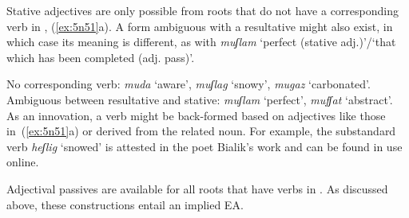 \begin{exe}
\begin{xlist}
\begin{exe}
\begin{xlist}
\begin{exe}
\begin{exe}
\begin{xlist}
\begin{exe}
\begin{exe}
\begin{xlist}
\begin{exe}
\begin{xlist}
\begin{exe}
\begin{xlist}
\begin{exe}
\begin{xlist}
\begin{exe}
\begin{xlist}
\begin{xlist}
\begin{exe}
\begin{xlist}
\begin{exe}
\begin{xlist}
\begin{exe}
\begin{exe}
\begin{exe}
\begin{xlist}
\begin{exe}
\begin{exe}
\begin{xlist}
\begin{exe}
\begin{xlist}
\begin{exe}
\begin{xlist}
\begin{exe}
\begin{xlist}
\begin{xlist}
\begin{exe}
\begin{xlist}
\begin{exe}
\begin{xlist}
\begin{exe}
\begin{xlist}
\begin{exe}
\begin{xlist}
\begin{exe}
\begin{exe}
\begin{exe}
\begin{exe}
\begin{exe}
\begin{xlist}
\begin{xlist}
\begin{exe}
\begin{xlist}
\begin{exe}
\begin{xlist}
\begin{exe}
\begin{exe}
\begin{exe}
\begin{xlist}
\begin{exe}
\begin{xlist}
Stative adjectives are only possible from roots that do not have a corresponding verb in \thif, (\ref{ex:5n51}a). A form ambiguous with a resultative might also exist, in which case its meaning is different, as with \emph{muʃlam} `perfect (stative adj.)'/`that which has been completed (adj. pass)'.
 \begin{exe}
 \ex  \label{ex:5n51}
 \begin{xlist} 
   \ex  No corresponding verb: \emph{muda} `aware', \emph{muʃlag} `snowy', \emph{mugaz} `carbonated'. 
   \ex  Ambiguous between resultative and stative: \emph{muʃlam} `perfect', \emph{mufʃat} `abstract'. 
 \z
\z 
As an innovation, a verb might be back-formed based on adjectives like those in~(\ref{ex:5n51}a) or derived from the related noun. For example, the substandard verb \emph{heʃlig} `snowed' is attested in the poet Bialik's work and can be found in use online.

Adjectival passives are available for all roots that have verbs in \thif. As discussed above, these constructions entail an implied EA.


\end{xlist}
\end{exe}
\end{xlist}
\end{exe}
\end{xlist}
\end{exe}
\end{exe}
\end{exe}
\end{xlist}
\end{exe}
\end{xlist}
\end{exe}
\end{xlist}
\end{xlist}
\end{exe}
\end{exe}
\end{exe}
\end{exe}
\end{exe}
\end{xlist}
\end{exe}
\end{xlist}
\end{exe}
\end{xlist}
\end{exe}
\end{xlist}
\end{exe}
\end{xlist}
\end{xlist}
\end{exe}
\end{xlist}
\end{exe}
\end{xlist}
\end{exe}
\end{xlist}
\end{exe}
\end{exe}
\end{xlist}
\end{exe}
\end{exe}
\end{exe}
\end{xlist}
\end{exe}
\end{xlist}
\end{exe}
\end{xlist}
\end{xlist}
\end{exe}
\end{xlist}
\end{exe}
\end{xlist}
\end{exe}
\end{xlist}
\end{exe}
\end{xlist}
\end{exe}
\end{exe}
\end{xlist}
\end{exe}
\end{exe}
\end{xlist}
\end{exe}
\end{xlist}
\end{exe}
